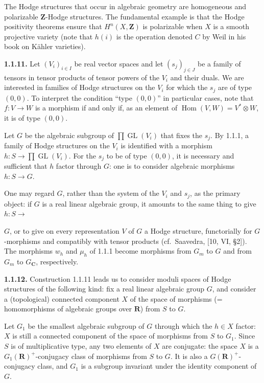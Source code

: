 \documentclass[10pt,a4paper]{article}
\newcommand{\SourcePage}[2]{\clearpage\setcounter{page}{#2}\typeout{D031_SOURCE_PAGE physical=#1 printed=#2}}
\begin{document}
The Hodge structures that occur in algebraic geometry are homogeneous and polarizable \(\mathbf Z\)-Hodge structures. The fundamental example is that the Hodge positivity theorems ensure that \(H^n(X,\mathbf Z)\) is polarizable when \(X\) is a smooth projective variety (note that \(h(i)\) is the operation denoted \(C\) by Weil in his book on Kähler varieties).

\textbf{1.1.11.} Let \((V_i)_{i\in I}\) be real vector spaces and let \((s_j)_{j\in J}\) be a family of tensors in tensor products of tensor powers of the \(V_i\) and their duals. We are interested in families of Hodge structures on the \(V_i\) for which the \(s_j\) are of type \((0,0)\). To interpret the condition ``type \((0,0)\)'' in particular cases, note that \(f:V\to W\) is a morphism if and only if, as an element of \(\operatorname{Hom}(V,W)=V^*\otimes W\), it is of type \((0,0)\).

Let \(G\) be the algebraic subgroup of \(\prod\operatorname{GL}(V_i)\) that fixes the \(s_j\). By 1.1.1, a family of Hodge structures on the \(V_i\) is identified with a morphism \(h:S\to\prod\operatorname{GL}(V_i)\). For the \(s_j\) to be of type \((0,0)\), it is necessary and sufficient that \(h\) factor through \(G\): one is to consider algebraic morphisms \(h:S\to G\).

One may regard \(G\), rather than the system of the \(V_i\) and \(s_j\), as the primary object: if \(G\) is a real linear algebraic group, it amounts to the same thing to give \(h:S\to\)

\SourcePage{8}{254}
\(G\), or to give on every representation \(V\) of \(G\) a Hodge structure, functorially for \(G\)-morphisms and compatibly with tensor products (cf.~Saavedra, {[}10, VI, §2{]}). The morphisms \(w_h\) and \(\mu_h\) of 1.1.1 become morphisms from \(G_m\) to \(G\) and from \(G_m\) to \(G_{\mathbf C}\), respectively.

\textbf{1.1.12.} Construction 1.1.11 leads us to consider moduli spaces of Hodge structures of the following kind: fix a real linear algebraic group \(G\), and consider a (topological) connected component \(X\) of the space of morphisms (= homomorphisms of algebraic groups over \(\mathbf R\)) from \(S\) to \(G\).

Let \(G_1\) be the smallest algebraic subgroup of \(G\) through which the \(h\in X\) factor: \(X\) is still a connected component of the space of morphisms from \(S\) to \(G_1\). Since \(S\) is of multiplicative type, any two elements of \(X\) are conjugate: the space \(X\) is a \(G_1(\mathbf R)^+\)-conjugacy class of morphisms from \(S\) to \(G\). It is also a \(G(\mathbf R)^+\)-conjugacy class, and \(G_1\) is a subgroup invariant under the identity component of \(G\).
\end{document}
